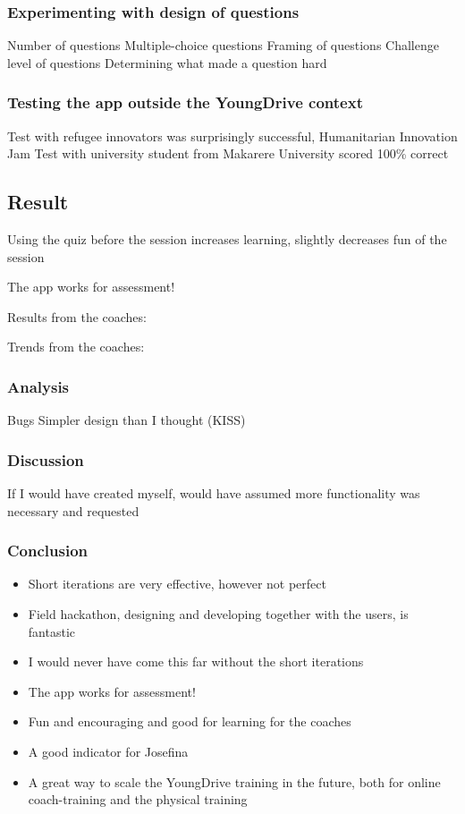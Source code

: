 \subsubsection{Experimenting with design of questions}
Number of questions
Multiple-choice questions
Framing of questions
Challenge level of questions
Determining what made a question hard

\subsubsection{Testing the app outside the YoungDrive context}
Test with refugee innovators was surprisingly successful, Humanitarian Innovation Jam
Test with university student from Makarere University scored 100\% correct

\subsection*{Result}
Using the quiz before the session increases learning, slightly decreases fun of the session

The app works for assessment!

Results from the coaches:

Trends from the coaches:

\subsubsection*{Analysis}
Bugs
Simpler design than I thought (KISS)

\subsubsection*{Discussion}
If I would have created myself, would have assumed more functionality was necessary and requested

\subsubsection*{Conclusion}
\begin{itemize}
\item Short iterations are very effective, however not perfect
\item Field hackathon, designing and developing together with the users, is fantastic
\item I would never have come this far without the short iterations
\item The app works for assessment!
\item Fun and encouraging and good for learning for the coaches
\item A good indicator for Josefina
\item A great way to scale the YoungDrive training in the future, both for online coach-training and the physical training
\end{itemize}

